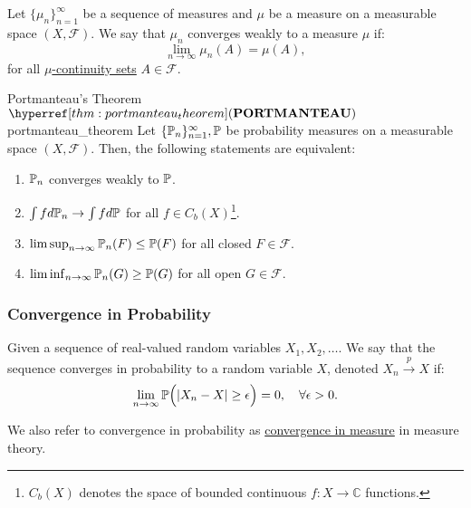 \begin{definition}
    Let $\{\mu_n\}_{n=1}^\infty$ be a sequence of measures and $\mu$ be a measure on a measurable space $(X, \mathcal{F})$. We say that $\mu_n$ converges weakly to a measure $\mu$ if:
    \begin{equation}
        \lim_{n\to\infty}\mu_n(A) = \mu(A),
    \end{equation} 
    \noindent for all \underline{$\mu$-continuity sets} $A\in\mathcal{F}$.
\end{definition} 


\begin{theorem}{Portmanteau's Theorem $\PORT$}{portmanteau_theorem}
    Let $\{\mathbb{P}_n\}_{n=1}^\infty, \mathbb{P}$ be probability measures on a measurable space $(X, \mathcal{F})$. Then, the following statements are equivalent:
    \begin{enumerate}
        \item $\mathbb{P}_n$ converges weakly to $\mathbb{P}$.
        \item $\int fd\mathbb{P}_n \to \int fd\mathbb{P}$ for all $f\in C_b(X)$\footnote{$C_b(X)$ denotes the space of bounded continuous $f:X\to\mathbb{C}$ functions.}.   
        \item $\limsup_{n\to\infty}\mathbb{P}_n(F) \le \mathbb{P}(F)$ for all closed $F\in\mathcal{F}$.
        \item $\liminf_{n\to\infty}\mathbb{P}_n(G) \ge \mathbb{P}(G)$ for all open $G\in\mathcal{F}$.  
    \end{enumerate}  
\end{theorem} 

\begin{proof*}
    
\end{proof*} 

\subsubsection{Convergence in Probability}
\begin{definition}
    Given a sequence of real-valued random variables $X_1, X_2, \dots$. We say that the sequence converges in probability to a random variable $X$, denoted $X_n\xrightarrow{p}X$ if:
    \begin{equation}
        \lim_{n\to\infty} \mathbb{P}\Big( |X_n - X| \ge \epsilon \Big) = 0, \quad \forall \epsilon > 0.
    \end{equation}

    \noindent We also refer to convergence in probability as \underline{convergence in measure} in measure theory.
\end{definition}

